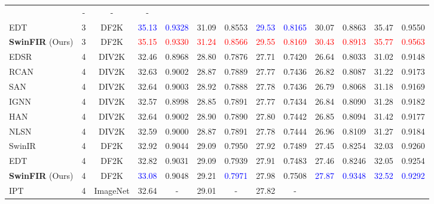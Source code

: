 \documentclass[10pt,twocolumn,letterpaper]{article}
\begin{document}
\begin{table*}[!t]
{\begin{tabular}{lcccccccccccc}
			& {-}
			& {-}
			& {-}
			\\
			EDT & 3 & DF2K & \textcolor{blue}{35.13}
			& \textcolor{blue}{0.9328}
			& 31.09
			& 0.8553
			& \textcolor{blue}{29.53}
			& \textcolor{blue}{0.8165}
			& 30.07
			& 0.8863
			& 35.47
			& 0.9550
			\\
			\textbf{SwinFIR} (Ours) & 3 & DF2K & \textcolor{red}{35.15}
			& \textcolor{red}{0.9330}
			& \textcolor{red}{31.24}
			& \textcolor{red}{0.8566}
			& \textcolor{red}{29.55}
			& \textcolor{red}{0.8169}
			& \textcolor{red}{30.43}
			& \textcolor{red}{0.8913}
			& \textcolor{red}{35.77}
			& \textcolor{red}{0.9563}
			\\
			\hline
			\hline
			EDSR & 4 & DIV2K & 32.46
			& 0.8968
			& 28.80
			& 0.7876
			& 27.71
			& 0.7420
			& 26.64
			& 0.8033
			& 31.02
			& 0.9148
			\\
			RCAN & 4 & DIV2K & 32.63
			& 0.9002
			& 28.87
			& 0.7889
			& 27.77
			& 0.7436
			& 26.82
			& 0.8087
			& 31.22
			& 0.9173
			\\
			SAN & 4 & DIV2K & {32.64}
			& {0.9003}
			& {28.92}
			& {0.7888}
			& {27.78}
			& {0.7436}
			& {26.79}
			& {0.8068}
			& {31.18}
			& {0.9169}
			\\
			IGNN & 4 & DIV2K & {32.57}
			& {0.8998}
			& {28.85}
			& {0.7891}
			& {27.77}
			& {0.7434}
			& {26.84}
			& {0.8090}
			& {31.28}
			& {0.9182}
			\\
			HAN & 4 & DIV2K & {32.64}
			& {0.9002}
			& {28.90}
			& {0.7890}
			& {27.80}
			& {0.7442}
			& {26.85}
			& {0.8094}
			& {31.42}
			& {0.9177}
			\\
			NLSN & 4 & DIV2K & 32.59 
			& 0.9000 
			& 28.87 
			& 0.7891 
			& 27.78 
			& 0.7444 
			& {26.96}
			& {0.8109}
			& 31.27 
			& 0.9184
			\\
			SwinIR & 4 & DF2K & 32.92
			& 0.9044
			& 29.09
			& 0.7950
			& 27.92
			& 0.7489
			& 27.45
			& 0.8254
			& 32.03
			& 0.9260
			\\
			EDT & 4 & DF2K & 32.82
			& 0.9031
			& 29.09
			& 0.7939
			& 27.91
			& 0.7483
			& 27.46
			& 0.8246
			& 32.05
			& 0.9254
			\\
			\textbf{SwinFIR} (Ours) & 4 & DF2K & \textcolor{blue}{33.08}
			& 0.9048
			& 29.21
			& \textcolor{blue}{0.7971}
			& 27.98
			& 0.7508
			& \textcolor{blue}{27.87}
			& \textcolor{blue}{0.9348}
			& \textcolor{blue}{32.52}
			& \textcolor{blue}{0.9292}
			\\
			\hdashline
			IPT & 4 & ImageNet & {32.64}
			& {-}
			& {29.01}
			& {-}
			& {27.82}
			& {-}

\end{tabular}}
\end{table*}
\end{document}
